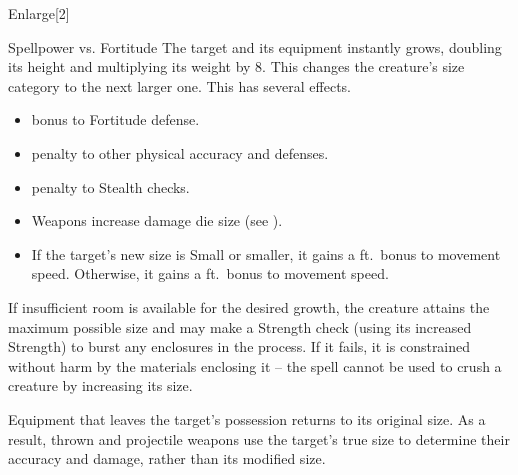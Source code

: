 \begin{spellsection}{Enlarge}[2]
    \begin{spellheader}
    \end{spellheader}
    \begin{spellcontent}
        \begin{spelltargetinginfo}
        \end{spelltargetinginfo}
        \begin{spelleffects}
            \begin{spellattack}{Spellpower vs. Fortitude}
                \spellsuccess The target and its equipment instantly grows, doubling its height and multiplying its weight by 8. This changes the creature's size category to the next larger one. This has several effects.
                \begin{itemize}
                    \item {} bonus to Fortitude defense.
                    \item {} penalty to other physical accuracy and defenses.
                    \item {} penalty to Stealth checks.
                    \item Weapons increase damage die size (see ).
                    \item If the target's new size is Small or smaller, it gains a  ft.\ bonus to movement speed. Otherwise, it gains a  ft.\ bonus to movement speed.
                \end{itemize}
                \par If insufficient room is available for the desired growth, the creature attains the maximum possible size and may make a Strength check (using its increased Strength) to burst any enclosures in the process. If it fails, it is constrained without harm by the materials enclosing it -- the spell cannot be used to crush a creature by increasing its size.
                \par Equipment that leaves the target's possession returns to its original size.
                As a result, thrown and projectile weapons use the target's true size to determine their accuracy and damage, rather than its modified size.
            \end{spellattack}
            \spelldur \durshort \dismissable
        \end{spelleffects}
    \end{spellcontent}

\end{spellsection}

